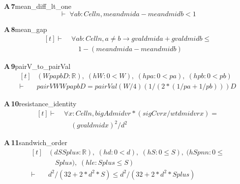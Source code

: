 \documentclass[conference]{IEEEtran}
\theoremstyle{definition}
\newcommand{\lean}[1]{\textsf{\footnotesize #1}}
\begin{document}
\noindent\textbf{A\,7}\quad\lean{mean\_diff\_lt\_one}
{\footnotesize\[ \vdash\; \forall \mathit{a} \mathit{b} : \mathit{Cell} \mathit{n}, \mathit{mean} \mathit{d} \mathit{mid} \mathit{a} - \mathit{mean} \mathit{d} \mathit{mid} \mathit{b} < 1 \]}

\noindent\textbf{A\,8}\quad\lean{mean\_gap}
{\footnotesize\[ \begin{aligned}[t]
\vdash\;&\forall \mathit{a} \mathit{b} : \mathit{Cell} \mathit{n}, \mathit{a} \neq \mathit{b} \to \mathit{gval} \mathit{d} \mathit{mid} \mathit{a} + \mathit{gval} \mathit{d} \mathit{mid} \mathit{b} \leq\\
&\quad 1 - (\mathit{mean} \mathit{d} \mathit{mid} \mathit{a} - \mathit{mean} \mathit{d} \mathit{mid} \mathit{b})
\end{aligned} \]}

\noindent\textbf{A\,9}\quad\lean{pairV\_to\_pairVal}
{\footnotesize\[ \begin{aligned}[t]
&(\mathit{W} \mathit{pa} \mathit{pb} \mathit{D} : \mathbb{R} ),\; (\mathit{hW} : 0 < \mathit{W}),\; (\mathit{hpa} : 0 < \mathit{pa}),\; (\mathit{hpb} : 0 < \mathit{pb})\\
\vdash\;&\mathit{pairV} \mathit{W} \mathit{W} \mathit{pa} \mathit{pb} \mathit{D} = \mathit{pairVal} (\mathit{W} / 4) (1 / (2 * (1 / \mathit{pa} + 1 / \mathit{pb}))) \mathit{D}
\end{aligned} \]}

\noindent\textbf{A\,10}\quad\lean{resistance\_identity}
{\footnotesize\[ \begin{aligned}[t]
\vdash\;&\forall \mathit{x} : \mathit{Cell} \mathit{n}, \mathit{bigA} \mathit{d} \mathit{mid} \mathit{vr} * (\mathit{sigC} \mathit{vr} \mathit{x} / \mathit{wt} \mathit{d} \mathit{mid} \mathit{vr} \mathit{x}) =\\
&\quad (\mathit{gval} \mathit{d} \mathit{mid} \mathit{x}) ^{2} / \mathit{d} ^{2}
\end{aligned} \]}

\noindent\textbf{A\,11}\quad\lean{sandwich\_order}
{\footnotesize\[ \begin{aligned}[t]
&(\mathit{d} \mathit{S} \mathit{Splus} : \mathbb{R} ),\; (\mathit{hd} : 0 < \mathit{d}),\; (\mathit{hS} : 0 \leq \mathit{S}),\; (\mathit{hSpnn} : 0 \leq\\
&\quad \mathit{Splus}),\; (\mathit{hle} : \mathit{Splus} \leq \mathit{S})\\
\vdash\;&\mathit{d} ^{2} / (32 + 2 * \mathit{d} ^{2} * \mathit{S}) \leq \mathit{d} ^{2} / (32 + 2 * \mathit{d} ^{2} * \mathit{Splus})
\end{aligned} \]}
\end{document}
